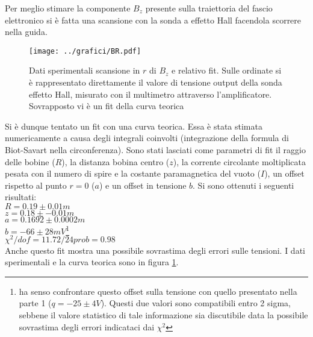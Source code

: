 \documentclass[10pt,a4paper]{article}
\begin{document}
Per meglio stimare la componente $B_z$ presente sulla traiettoria del fascio elettronico si è fatta una scansione con la sonda a effetto Hall facendola scorrere nella guida. 

\begin{figure}[h!]
	\centering
	\texttt{[image: ../grafici/BR.pdf]}
	\caption{Dati sperimentali scansione in $r$ di $B_z$ e relativo fit. Sulle ordinate si è rappresentato direttamente il valore di tensione output della sonda effetto Hall, misurato con il multimetro attraverso l'amplificatore. Sovrapposto vi è un fit della curva teorica}
	\label{BR}
\end{figure}

Si è dunque tentato un fit con una curva teorica. Essa è stata stimata numericamente a causa degli integrali coinvolti (integrazione della formula di Biot-Savart nella circonferenza). Sono stati lasciati come parametri di fit il raggio delle bobine ($R$), la distanza bobina centro ($z$), la corrente circolante moltiplicata pesata con il numero di spire e la costante paramagnetica del vuoto ($I$), un offset rispetto al punto $r=0$ ($a$) e un offset in tensione $b$. Si sono ottenuti i seguenti risultati:\\

$R=0.19\pm 0.01 m$\\
$z=0.18\pm-0.01 m$ \\
$a=0.1692 \pm 0.0002 m$\\ 
$b=-66 \pm 28 mV$\footnote{ha senso confrontare questo offset sulla tensione con quello presentato nella parte 1 ($q=-25\pm 4 V$). Questi due valori sono compatibili entro 2 sigma, sebbene il valore statistico di tale informazione sia discutibile data la possibile sovrastima degli errori indicataci dai $\chi^2$}\\
$\chi^2/dof=11.72 / 24 prob= 0.98$\\

Anche questo fit mostra una possibile sovrastima degli errori sulle tensioni. I dati sperimentali e la curva teorica sono in figura \ref{BR}.
\
\end{document}
